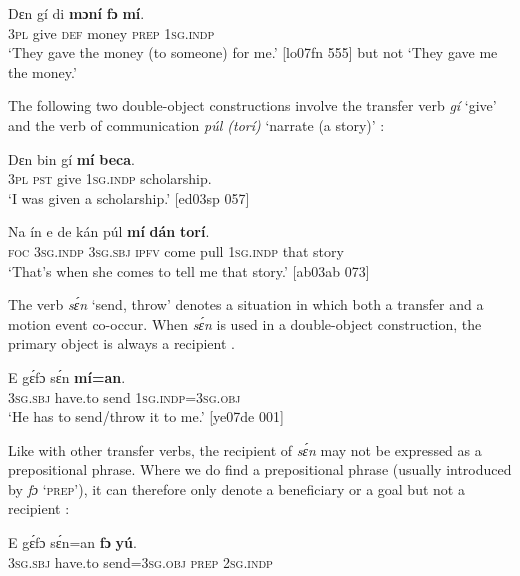 \ea%
    \label{ex:key:1205}
    \gll Dɛn  gí  di  \textbf{mɔní}    \textbf{fɔ}  \textbf{mí}.\\
\textsc{3pl}  give  \textsc{def}  money    \textsc{prep}  \textsc{1sg.indp}\\

\glt 
 ‘They gave the money (to someone) for me.’ [lo07fn 555]
but not ‘They gave me the money.’
\z

The following two double-object constructions involve the transfer verb \textit{gí} ‘give’  and the verb of communication \textit{púl (torí)} ‘narrate (a story)’ :


\ea%
    \label{ex:key:1206}
    \gll Dɛn    bin  gí    \textbf{mí}      \textbf{beca}.\\
\textsc{3pl}    \textsc{pst}  give    \textsc{1sg.indp}    scholarship.\\

\glt ‘I was given a scholarship.’ [ed03sp 057]
\z


\ea%
    \label{ex:key:1207}
    \gll Na  ín    e    de  kán    púl  \textbf{mí}    \textbf{dán}  \textbf{torí}.\\
\textsc{foc}  \textsc{3sg.indp}  \textsc{3sg.sbj}  \textsc{ipfv}  come  pull  \textsc{1sg.indp}  that  story\\

\glt ‘That’s when she comes to tell me that story.’ [ab03ab 073]
\z

The verb \textit{sɛ́n} ‘send, throw’ denotes a situation in which both a transfer and a motion event{\fff} co-occur. When \textit{sɛ́n} is used in a double-object construction, the primary object is always a recipient . 


\ea%
    \label{ex:key:1208}
    \gll E    gɛ́fɔ    sɛ́n    \textbf{mí=an}.\\
\textsc{3sg.sbj}  have.to  send  \textsc{1sg.indp}=\textsc{3sg.obj}\\

\glt ‘He has to send/throw it to me.’ [ye07de 001]
\z

Like with other transfer verbs, the recipient of \textit{sɛ́n} may not be expressed as a prepositional phrase. Where we do find a prepositional phrase (usually introduced by \textit{fɔ} ‘\textsc{prep}’), it can therefore only denote a beneficiary {\fff}or a goal{\fff} but not a recipient {\fff}:


\ea%
    \label{ex:key:1209}
    \gll E    gɛ́fɔ    sɛ́n=an    \textbf{fɔ}  \textbf{yú}.\\
\textsc{3sg.sbj}  have.to  send=\textsc{3sg.obj}  \textsc{prep}  \textsc{2sg.indp}\\

